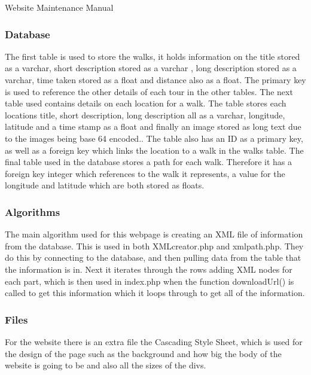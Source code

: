 \documentclass{article}
\begin{document}
\begin{section}{Website Maintenance Manual}
		\subsubsection{Database}
		The first table is used to store the walks, it holds information on the title stored as a varchar, short description stored as a varchar , long description stored as a varchar, time taken stored as a float and distance also as a float. The primary key is used to reference the other details of each tour in the other tables. The next table used contains details on each location for a walk. The table stores each locations title, short description, long description all as a varchar, longitude, latitude and a time stamp as a float and finally an image stored as long text due to the images being base 64 encoded.. The table also has an ID as a primary key, as well as a foreign key which links the location to a walk in the walks table.
The final table used in the database stores a path for each walk. Therefore it has a foreign key integer which references to the walk it represents, a value for the longitude and latitude which are both stored as floats. 


		\subsubsection{Algorithms}
		The main algorithm used for this webpage is creating an XML file of information from the database. This is used in both XMLcreator.php and xmlpath.php. They do this by connecting to the database, and then pulling data from the table that the information is in. Next it iterates through the rows adding XML nodes for each part, which is then used in index.php when the function downloadUrl() is called to get this information which it loops through to get all of the information.


		\subsubsection{Files}
		For the website there is an extra file the Cascading Style Sheet, which is used for the design of the page such as the background and how big the body of the website is going to be and also all the sizes of the divs.


\end{section}
\end{document}

